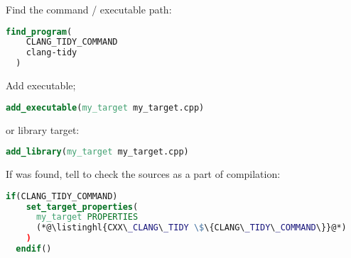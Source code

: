 \documentclass[compress,table,xcolor=table]{beamer}
\begin{document}
\begin{frame}[fragile]
  \Large
  Find the  command / executable path:
  \begin{lstlisting}[language=cmake]
  find_program(
    CLANG_TIDY_COMMAND
    clang-tidy
  )
  \end{lstlisting}

  Add executable;
  \begin{lstlisting}[language=cmake]
  add_executable(my_target my_target.cpp)
  \end{lstlisting}

  or library target:
  \begin{lstlisting}[language=cmake]
  add_library(my_target my_target.cpp)
  \end{lstlisting}
\end{frame}
\begin{frame}[fragile]
  \Large
  If  was found, tell  to check the sources
  as a part of compilation:
  \begin{lstlisting}[language=cmake]
  if(CLANG_TIDY_COMMAND)
    set_target_properties(
      my_target PROPERTIES
      (*@\listinghl{CXX\_CLANG\_TIDY \$\{CLANG\_TIDY\_COMMAND\}}@*)
    )
  endif()
  \end{lstlisting}
\end{frame}
\end{document}
